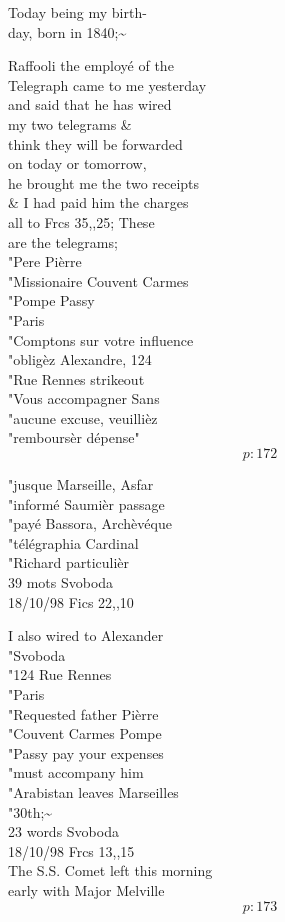 \documentclass{report}
\begin{document}
	\par{
 	Today being my birth-\ \\day, born in 1840;\~{}\ \\
	}

	\par{
 	Raffooli the employé of the\ \\Telegraph came to me yesterday\ \\and said that he has wired\ \\my two telegrams \&\ \\think they will be forwarded\ \\on today or tomorrow,\ \\he brought me the two receipts\ \\\& I had paid him the charges\ \\all to Frcs 35,,25; These\ \\are the telegrams;\ \\"Pere Pièrre\ \\"Missionaire Couvent Carmes\ \\"Pompe Passy\ \\"Paris\ \\"Comptons sur votre influence\ \\"obligèz Alexandre, 124\ \\"Rue Rennes \lbrack strikeout\rbrack\ \\"Vous accompagner Sans\ \\"aucune excuse, veuillièz\ \\"remboursèr dépense"\ \\
  \[p: 172 \]

	}

	\par{
 	"jusque Marseille, Asfar\ \\"informé Saumièr passage\ \\"payé Bassora, Archèvéque\ \\"télégraphia Cardinal\ \\"Richard particulièr\ \\39 mots Svoboda\ \\18/10/98 Fics 22,,10\ \\
	}

	\par{
 	I also wired to Alexander\ \\"Svoboda\ \\"124 Rue Rennes\ \\"Paris\ \\"Requested father Pièrre\ \\"Couvent Carmes Pompe\ \\"Passy pay your expenses\ \\"must accompany him\ \\"Arabistan leaves Marseilles\ \\"30th;\~{}\ \\23 words Svoboda\ \\18/10/98 Frcs 13,,15\ \\The S.S. Comet left this morning\ \\early with Major Melville\ \\
  \[p: 173 \]

	}
\end{document}

